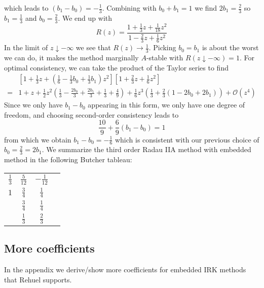 \documentclass[10pt,a4paper]{article}
\newcommand{\half}[0]{\frac{1}{2}}
\begin{document}
which leads to $(b_1 - b_0) = -\frac{1}{3}.$ Combining with $b_0+b_1=1$ we find $2b_1 = \frac{2}{3}$ so $b_1=\frac{1}{3}$ and $b_0 = \frac{2}{3}.$ We end up with
\begin{equation*}
  R(z) = \frac{1 + \frac{1}{3}z + \frac{1}{18}z^2}{1 - \frac{2}{3}z + \frac{1}{6}z^2}
\end{equation*}
In the limit of $z \downarrow -\infty$ we see that $R(z) \rightarrow \frac{1}{3}.$
Picking $b_0=b_1$ is about the worst we can do, it makes the method marginally $A$-stable with $R(z\downarrow -\infty)=1.$
For optimal consistency, we can take the product of the Taylor series to find
\begin{align*}
  &\left[1 + \frac{1}{3}z + \left(\frac{1}{6} - \frac{1}{3}b_0 + \frac{1}{3}b_1\right)z^2\right]\left[1 + \frac{2}{3}z + \frac{1}{6}z^2\right] \\
  =& 1 + z + \half z^2\left(\frac{1}{3} - \frac{2b_0}{3} + \frac{2b_1}{3} + \frac{1}{3} + \frac{4}{9}\right) + \frac{1}{6}z^3 \left(\frac{1}{3}  + \frac{2}{3}\left(1 - 2b_0 + 2b_1\right)\right)  + \mathcal{O}(z^4)
\end{align*}
Since we only have $b_1-b_0$ appearing in this form, we only have one degree of freedom, and choosing second-order consistency leads to
\begin{equation*}
  \frac{10}{9} + \frac{6}{9}(b_1-b_0) = 1
\end{equation*}
from which we obtain $b_1-b_0 = -\frac{1}{6}$ which is consistent with our previous choice of $b_0 = \frac{2}{3} = 2b_1.$
We summarize the third order Radau IIA method with embedded method in the following Butcher tableau:
\begin{table}[h]
  \centering
  \begin{tabular}{c|ccc}
    $\frac{1}{3}$ & $\frac{5}{12}$ & $-\frac{1}{12} $ \\
    $1$ & $\frac{3}{4}$ & $\frac{1}{4}$ \\ \hline
    {} & $\frac{3}{4}$ & $\frac{1}{4}$ \\
    {} & $\frac{1}{3}$ & $\frac{2}{3}$
  \end{tabular}
\end{table}

\subsection{More coefficients}
In the appendix we derive/show more coefficients for embedded IRK methods that Rehuel supports.

\clearpage{}
\end{document}
